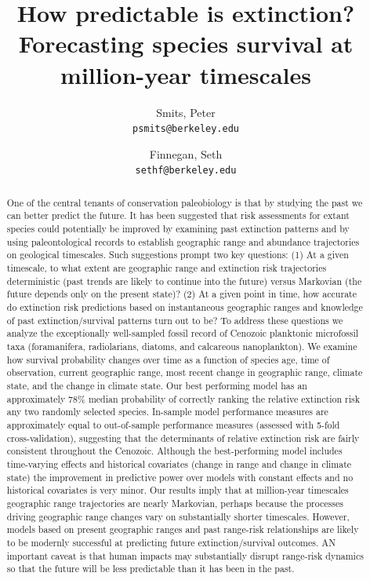 \documentclass[12pt,letterpaper]{article}
\title{How predictable is extinction? Forecasting species survival at million-year timescales}
\author{
  Smits, Peter\\
  \texttt{psmits@berkeley.edu} 
  \and
  Finnegan, Seth\\
  \texttt{sethf@berkeley.edu}
}
\begin{document}
\maketitle

\linenumbers{}
\modulolinenumbers[3]

\begin{abstract}
  One of the central tenants of conservation paleobiology is that by studying the past we can better predict the future. It has been suggested that risk assessments for extant species could potentially be improved by examining past extinction patterns and by using paleontological records to establish geographic range and abundance trajectories on geological timescales. Such suggestions prompt two key questions: (1) At a given timescale, to what extent are geographic range and extinction risk trajectories deterministic (past trends are likely to continue into the future) versus Markovian (the future depends only on the present state)? (2) At a given point in time, how accurate do extinction risk predictions based on instantaneous geographic ranges and knowledge of past extinction/survival patterns  turn out to be? To address these questions we analyze the exceptionally well-sampled fossil record of Cenozoic planktonic microfossil taxa (foramanifera, radiolarians, diatoms, and calcareous nanoplankton). We examine how survival probability changes over time as a function of species age, time of observation, current geographic range, most recent change in geographic range, climate state, and the change in climate state. Our best performing model has an approximately 78\% median probability of correctly ranking the relative extinction risk any two randomly selected species. In-sample model performance measures are approximately equal to out-of-sample performance measures (assessed with 5-fold cross-validation), suggesting that the determinants of relative extinction risk are fairly consistent throughout the Cenozoic. Although the best-performing model includes time-varying effects and historical covariates (change in range and change in climate state) the improvement in predictive power over models with constant effects and no historical covariates is very minor. Our results imply that at million-year timescales geographic range trajectories are nearly Markovian, perhaps because the processes driving geographic range changes vary on substantially shorter timescales. However, models based on present geographic ranges and past range-risk relationships are likely to be modernly successful at predicting future extinction/survival outcomes. AN important caveat is that human impacts may substantially disrupt range-risk dynamics so that the future will be less predictable than it has been in the past.
  

\end{abstract}
\end{document}
